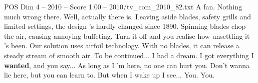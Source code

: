 \begin{textsample}{POS Dim 4 – 2010 – Score 1.00 – 2010/tv\_com\_2010\_82.txt}  \label{ex:f4_pos_055}
A fan.
Nothing much wrong there.
Well, actually there is.
Leaving aside blades, safety grills and limited settings, the design 's hardly changed since 1890.
Spinning blades chop the air, causing annoying buffeting.
Turn it off and you realise how unsettling it 's been.
Our solution uses airfoil technology.
With no blades, it can release a steady stream of smooth air.
To be continued...
I had a dream.
I got everything I \textbf{wanted}, and you say...
As long as I 'm here, no one can hurt you.
Don't wanna lie here, but you can learn to.
But when I wake up I see...
You.
You.

\end{textsample}
